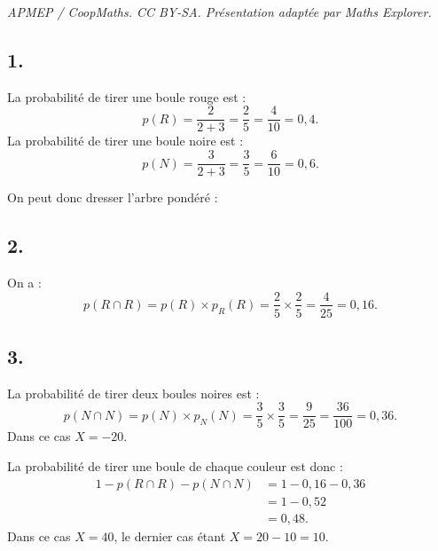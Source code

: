 \documentclass[10pt]{article}
\begin{document}
\noindent\textit{APMEP / CoopMaths. CC BY-SA. Présentation adaptée par Maths Explorer.}\par\medskip
\subsection*{1.}

La probabilité de tirer une boule rouge est :
\[
p(R) = \dfrac{2}{2+3} = \dfrac{2}{5} = \dfrac{4}{10} = 0{,}4.
\]
La probabilité de tirer une boule noire est :
\[
p(N) = \dfrac{3}{2+3} = \dfrac{3}{5} = \dfrac{6}{10} = 0{,}6.
\]

On peut donc dresser l’arbre pondéré :
\begin{center}
\end{center}

\subsection*{2.}

On a :
\[
p(R \cap R) = p(R) \times p_R(R) = \dfrac{2}{5} \times \dfrac{2}{5} = \dfrac{4}{25} = 0{,}16.
\]

\subsection*{3.}

La probabilité de tirer deux boules noires est :
\[
p(N \cap N) = p(N) \times p_N(N) = \dfrac{3}{5} \times \dfrac{3}{5} = \dfrac{9}{25} = \dfrac{36}{100} = 0{,}36.
\]
Dans ce cas \(X = -20\).

La probabilité de tirer une boule de chaque couleur est donc :
\begin{align*}
1 - p(R \cap R) - p(N \cap N) &= 1 - 0{,}16 - 0{,}36 \\
&= 1 - 0{,}52 \\
&= 0{,}48.
\end{align*}
Dans ce cas \(X = 40\), le dernier cas étant \(X = 20 - 10 = 10\).
\end{document}
